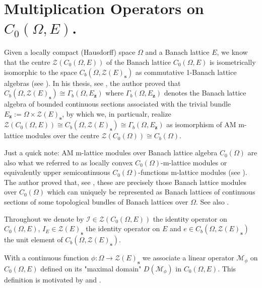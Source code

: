 \documentclass{article}
\newcommand{\Bm}[1]{ \boldsymbol{ #1 }}
\newcommand{\mI}{\mathcal{I}}
\newcommand{\mZ}{\mathcal{Z}}
\newcommand{\mM}{\mathcal{M}}
\newcommand{\ti}{\times}
\newcommand{\lo}{\longrightarrow}
\newcommand{\Ga}{\Gamma}
\newcommand{\Om}{\Omega}
\begin{document}
	
	
	
\section{Multiplication Operators on $C_0(\Om, E)$.}\label{sec:mop}

Given a locally compact (Hausdorff) space  $\Om$ and a Banach lattice $E$, we know that the centre $\Bm{\mZ} ( C_0(\Om, E))$ of the Banach lattice $C_0(\Om, E)$ is isometrically isomorphic to the space $C_b(\Om, \Bm{\mZ}(E)_\textbf{s})$ as commutative 1-Banach lattice algebras (see  \cite[Theorem 6.2, p.135]{ErcanWickstead96}). In his thesis, see \cite[Chapter 3, Proposition 3.6.6.1, p.113-116]{David2022}, the author proved that $C_b(\Om, \Bm{\mZ}(E)_\textbf{s})\cong \Ga_b(\Om, E_\textbf{z})$ where $ \Ga_b(\Om, E_\textbf{z})$ denotes the Banach lattice algebra of bounded continuous sections associated with the trivial bundle $E_\textbf{z}:=\Om \ti \Bm{\mZ}(E)_\textbf{s}$, by which we, in particualr, realize $\Bm{\mZ} ( C_0(\Om, E))\cong C_b(\Om, \Bm{\mZ}(E)_\textbf{s})\cong \Ga_b(\Om, E_\textbf{z})$ as isomorphism of AM m-lattice modules over the centre $ \Bm{\mZ}(C_0(\Om))\cong C_b(\Om)$. 


Just a quick note: AM m-lattice modules over Banach lattice algebra $C_0(\Om)$ are also what we referred to as locally convex  $C_0(\Om)$-m-lattice modules or equivalently upper semicontinuous  $C_0(\Om)$-functions  m-lattice modules (see \cite[Chapter 2, Corollary 2.4.1.10, p.32]{David2022}). The author proved that, see \cite[Chapter 3, Proposition 3.5.0.9, p.85-88]{David2022}, these are precisely those Banach lattice modules over $C_0(\Om)$ which can uniquely be represented as Banach lattices of continuous sections of some topological bundles of Banach lattices over $\Om$. See also \cite[Corollary 7.28, p.78-79]{Gierz1982}.
\bigskip 


Throughout we denote by $\mI\in \Bm{\mZ} ( C_0(\Om, E))$ the identity operator on $C_0(\Om, E)$, $I_E\in\Bm{\mZ}(E)_\textbf{s} $ the identity operator on $E$ and $e\in C_b(\Om, \Bm{\mZ}(E)_\textbf{s})$ the unit element of $C_b(\Om, \Bm{\mZ}(E)_\textbf{s})$. 
\bigskip 

With a continuous function $\phi : \Om \lo  \Bm{\mZ}(E)_\textbf{s}$ we associate a linear operator $\mM_\phi$ on $C_0(\Om, E)$ defined on its "maximal domain"  $D(\mM_\phi)$ in $C_0(\Om, E)$.  This definition is motivated by \cite[Definition 3.1, p.20]{engel2006short} and \cite[Definition 1.1, p.575]{Heymann2013}.
\end{document}
